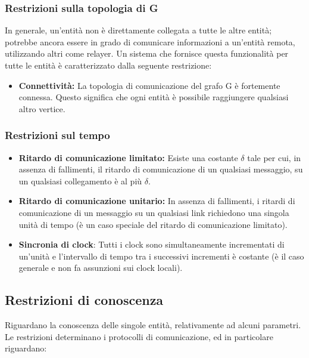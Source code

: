 \subsubsection{Restrizioni sulla topologia di G}
In generale, un'entità non è direttamente collegata a tutte le altre entità;
potrebbe ancora essere in grado di comunicare informazioni a un'entità remota,
utilizzando altri come relayer. Un sistema che fornisce questa funzionalità per
tutte le entità è caratterizzato dalla seguente restrizione:

\begin{itemize}
    \item \textbf{ Connettività:} La topologia di comunicazione del grafo G è
          fortemente connessa. Questo significa che ogni entità è possibile raggiungere
          qualsiasi altro vertice.
\end{itemize}

\subsubsection{Restrizioni sul tempo}

\begin{itemize}
    \item \textbf{Ritardo di comunicazione limitato:} Esiste una costante $\delta$
          tale per cui, in assenza di fallimenti, il ritardo di comunicazione di un
          qualsiasi messaggio, su un qualsiasi collegamento è al più $\delta$.
    \item \textbf{Ritardo di comunicazione unitario:} In assenza di fallimenti, i
          ritardi di comunicazione di un messaggio su un qualsiasi link richiedono una
          singola unità di tempo (è un caso speciale del ritardo di comunicazione
          limitato).
    \item \textbf{Sincronia di clock}: Tutti i clock sono simultaneamente
          incrementati di un'unità e l'intervallo di tempo tra i successivi incrementi è
          costante (è il caso generale e non fa assunzioni sui clock locali).
\end{itemize}

\subsection{Restrizioni di conoscenza}
Riguardano la conoscenza delle singole entità, relativamente ad alcuni
parametri. \\
Le restrizioni determinano i protocolli di comunicazione, ed in particolare
riguardano:

